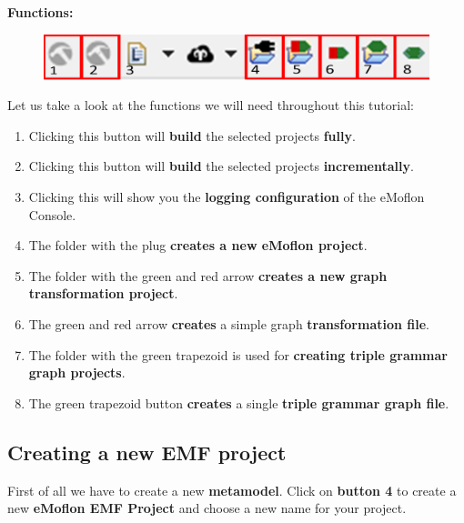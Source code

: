 \clearpage

\textbf{Functions:\newline}

\begin{figure}[h]
    \centering
    \includegraphics[scale=0.25]{pictures/toolbar_eMoflon.png}
    \caption{}
    \label{toolbar}
\end{figure}

Let us take a look at the functions we will need throughout this tutorial:

\begin{enumerate}
\item Clicking this button will \textbf{build} the selected projects \textbf{fully}.
\label{item:0}

\item Clicking this button will \textbf{build} the selected projects \textbf{incrementally}.

\item Clicking this will show you the \textbf{logging configuration} of the eMoflon Console.

\item
\label{item:1}
The folder with the plug \textbf{creates a new eMoflon project}.

\item
\label{item:2}The folder with the green and red arrow \textbf{creates a new graph transformation project}.
\item The green and red arrow \textbf{creates} a simple graph \textbf{transformation file}.
\item 
\label{item:3}The folder with the green trapezoid is used for \textbf{creating triple grammar graph projects}.
\item \label{tgg_rule} The green trapezoid button \textbf{creates} a single \textbf{triple grammar graph file}. 
\end{enumerate}

\clearpage

\subsection{Creating a new EMF project}

First of all we have to create a new \textbf{metamodel}. Click on \textbf{button 4} to create a new \textbf{\textsf{eMoflon EMF Project}} and choose a new name for your project.

